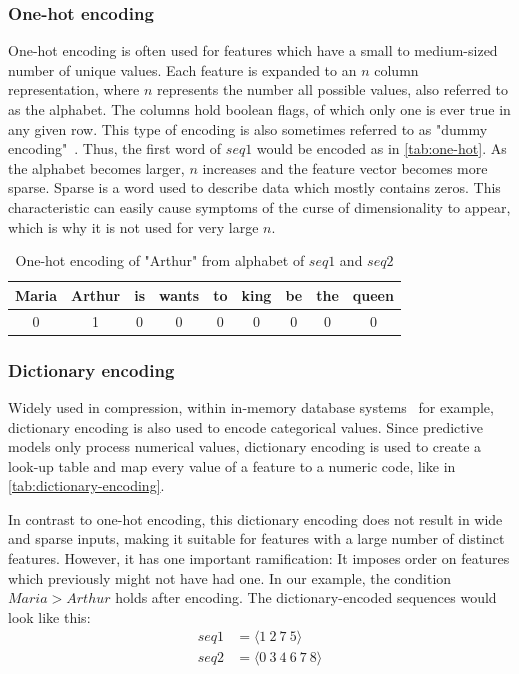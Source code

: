\subsubsection*{One-hot encoding}
One-hot encoding is often used for features which have a small to medium-sized number of unique values. Each feature is expanded to an $n$ column representation, where $n$ represents the number all possible values, also referred to as the alphabet. The columns hold boolean flags, of which only one is ever true in any given row. This type of encoding is also sometimes referred to as "dummy encoding"~\cite{web:pandas-get-dummies}. Thus, the first word of $seq1$ would be encoded as in \autoref{tab:one-hot}. As the alphabet becomes larger, $n$ increases and the feature vector becomes more sparse. Sparse is a word used to describe data which mostly contains zeros. This characteristic can easily cause symptoms of the curse of dimensionality to appear, which is why it is not used for very large $n$.

\begin{table}[ht]
    \centering
    \begin{tabular}{c|c|c|c|c|c|c|c|c}
        Maria & Arthur & is & wants & to & king & be & the & queen\\
        \midrule
        0 & 1 & 0 & 0 & 0 & 0 & 0 & 0 & 0\\
    \end{tabular}
    \caption{One-hot encoding of "Arthur" from alphabet of $seq1$ and $seq2$}
    \label{tab:one-hot}
\end{table}

\subsubsection*{Dictionary encoding}
Widely used in compression, within in-memory database systems~\cite{plattner2012memory} for example, dictionary encoding is also used to encode categorical values. Since predictive models only process numerical values, dictionary encoding is used to create a look-up table and map every value of a feature to a numeric code, like in \autoref{tab:dictionary-encoding}.

In contrast to one-hot encoding, this dictionary encoding does not result in wide and sparse inputs, making it suitable for features with a large number of distinct features. However, it has one important ramification: It imposes order on features which previously might not have had one. In our example, the condition $Maria > Arthur$ holds after encoding. The dictionary-encoded sequences would look like this:
\begin{equation*}
    \begin{split}
        seq1 &= \langle1\ 2\ 7\ 5\rangle\\
        seq2 &= \langle0\ 3\ 4\ 6\ 7\ 8\rangle
    \end{split}
\end{equation*}


